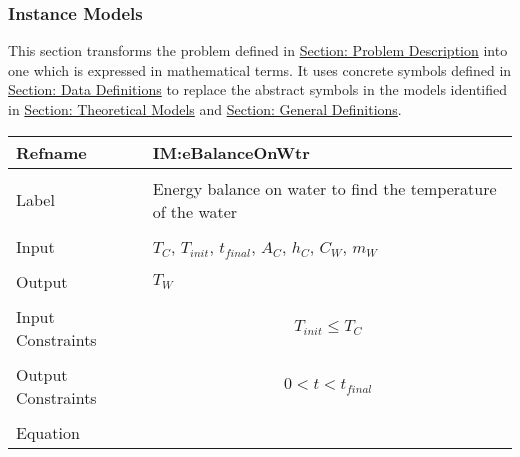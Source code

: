 \documentclass[12pt]{article}
\begin{document}
\subsubsection{Instance Models}
\label{Sec:IMs}
This section transforms the problem defined in \hyperref[Sec:ProbDesc]{Section: Problem Description} into one which is expressed in mathematical terms. It uses concrete symbols defined in \hyperref[Sec:DDs]{Section: Data Definitions} to replace the abstract symbols in the models identified in \hyperref[Sec:TMs]{Section: Theoretical Models} and \hyperref[Sec:GDs]{Section: General Definitions}.
~\newline
 \noindent \begin{minipage}{\textwidth}
\begin{tabular}{p{} p{}}
\toprule \textbf{Refname} & \textbf{IM:eBalanceOnWtr}
\label{IM:eBalanceOnWtr}
\\ \midrule \\
Label & Energy balance on water to find the temperature of the water
        \\ \midrule \\
        Input & ${T_{C}}$, ${T_{init}}$, ${t_{final}}$, ${A_{C}}$, ${h_{C}}$, ${C_{W}}$, ${m_{W}}$
                \\ \midrule \\
                Output & ${T_{W}}$
                         \\ \midrule \\
                         Input Constraints & \begin{displaymath}
                                             {T_{init}}\leq{}{T_{C}}
                                             \end{displaymath}
                                             \\ \midrule \\
                                             Output Constraints & \begin{displaymath}
                                                                  0<t<{t_{final}}
                                                                  \end{displaymath}
                                                                  \\ \midrule \\
                                                                  Equation & \begin{displaymath}

\end{displaymath}
\end{tabular}
\end{minipage}
\end{document}
